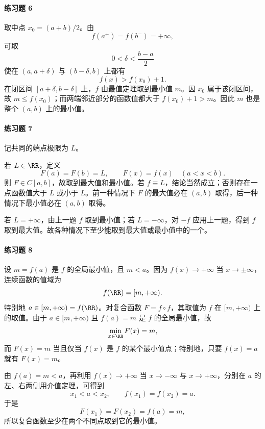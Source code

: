 \paragraph{练习题 6}
\begin{xsolution}
取中点 $x_0=(a+b)/2$。由
\[
 f(a^+)=f(b^-)=+\infty,
\]
可取
\[
 0<\delta<\frac{b-a}{2}
\]
使在 $(a,a+\delta)$ 与 $(b-\delta,b)$ 上都有
\[
 f(x)>f(x_0)+1.
\]
在闭区间 $[a+\delta,b-\delta]$ 上，$f$ 由最值定理取到最小值 $m$。因 $x_0$ 属于该闭区间，故 $m\le f(x_0)$；而两端邻近部分的函数值都大于 $f(x_0)+1>m$。因此 $m$ 也是整个 $(a,b)$ 上的最小值。
\end{xsolution}

\paragraph{练习题 7}
\begin{xsolution}
记共同的端点极限为 $L$。

若 $L\in\RR$，定义
\[
 F(a)=F(b)=L,\qquad F(x)=f(x)\quad(a<x<b).
\]
则 $F\in C[a,b]$，故取到最大值和最小值。若 $f\equiv L$，结论当然成立；否则存在一点函数值大于 $L$ 或小于 $L$。前一种情况下 $F$ 的最大值必在 $(a,b)$ 取得，后一种情况下最小值必在 $(a,b)$ 取得。

若 $L=+\infty$，由上一题 $f$ 取到最小值；若 $L=-\infty$，对 $-f$ 应用上一题，得到 $f$ 取到最大值。故各种情况下至少能取到最大值或最小值中的一个。
\end{xsolution}

\paragraph{练习题 8}
\begin{xsolution}
设 $m=f(a)$ 是 $f$ 的全局最小值，且 $m<a$。因为 $f(x)\to+\infty$ 当 $x\to\pm\infty$，连续函数的值域为
\[
 f(\RR)=[m,+\infty).
\]
特别地 $a\in[m,+\infty)=f(\RR)$。对复合函数 $F=f\circ f$，其取值为 $f$ 在 $[m,+\infty)$ 上的取值。由于 $a\in[m,+\infty)$ 且 $f(a)=m$ 是 $f$ 的全局最小值，故
\[
 \min_{x\in\RR}F(x)=m,
\]
而 $F(x)=m$ 当且仅当 $f(x)$ 是 $f$ 的某个最小值点；特别地，只要 $f(x)=a$ 就有 $F(x)=m$。

由 $f(a)=m<a$，再利用 $f(x)\to+\infty$ 当 $x\to-\infty$ 与 $x\to+\infty$，分别在 $a$ 的左、右两侧用介值定理，可得到
\[
 x_1<a<x_2,
 \qquad f(x_1)=f(x_2)=a.
\]
于是
\[
 F(x_1)=F(x_2)=f(a)=m,
\]
所以复合函数至少在两个不同点取到它的最小值。
\end{xsolution}

